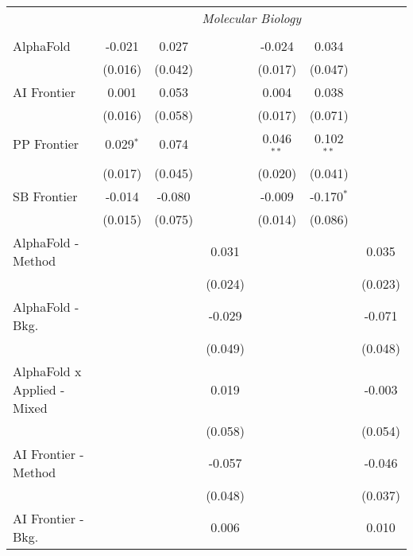 \begin{tabular}{lcccccc}
 & \multicolumn{6}{c}{\textit{Molecular Biology}} \\ \\
   AlphaFold                     & -0.021      & 0.027   &             & -0.024       & 0.034        &   \\   
                                 & (0.016)     & (0.042) &             & (0.017)      & (0.047)      &   \\   
   AI Frontier                   & 0.001       & 0.053   &             & 0.004        & 0.038        &   \\   
                                 & (0.016)     & (0.058) &             & (0.017)      & (0.071)      &   \\   
   PP Frontier                   & 0.029$^{*}$ & 0.074   &             & 0.046$^{**}$ & 0.102$^{**}$ &   \\   
                                 & (0.017)     & (0.045) &             & (0.020)      & (0.041)      &   \\   
   SB Frontier                   & -0.014      & -0.080  &             & -0.009       & -0.170$^{*}$ &   \\   
                                 & (0.015)     & (0.075) &             & (0.014)      & (0.086)      &   \\   
   AlphaFold - Method            &             &         & 0.031       &              &              & 0.035\\   
                                 &             &         & (0.024)     &              &              & (0.023)\\   
   AlphaFold - Bkg.              &             &         & -0.029      &              &              & -0.071\\   
                                 &             &         & (0.049)     &              &              & (0.048)\\   
   AlphaFold x Applied - Mixed   &             &         & 0.019       &              &              & -0.003\\   
                                 &             &         & (0.058)     &              &              & (0.054)\\   
   AI Frontier - Method          &             &         & -0.057      &              &              & -0.046\\   
                                 &             &         & (0.048)     &              &              & (0.037)\\   
   AI Frontier - Bkg.            &             &         & 0.006       &              &              & 0.010\\   

\end{tabular}
